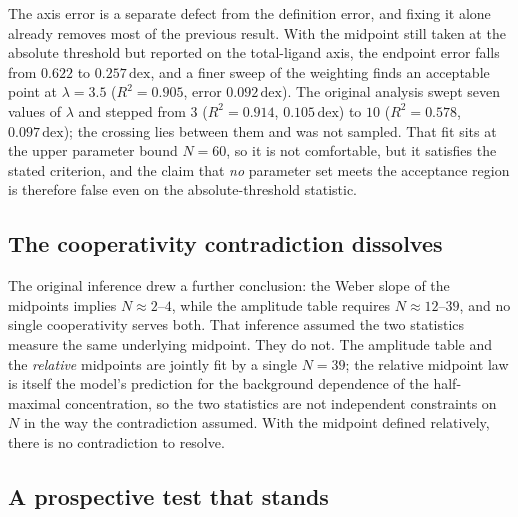 ﻿\documentclass[11pt,a4paper]{article}
\newcommand{\dex}{\ensuremath{\,\mathrm{dex}}}
\begin{document}
The axis error is a separate defect from the definition error, and fixing it alone already removes
most of the previous result. With the midpoint still taken at the absolute threshold but reported on
the total-ligand axis, the endpoint error falls from $0.622$ to $0.257\dex$, and a finer sweep of the
weighting finds an acceptable point at $\lambda=3.5$ ($R^2=0.905$, error $0.092\dex$). The original
analysis swept seven values of $\lambda$ and stepped from $3$ ($R^2=0.914$, $0.105\dex$) to $10$
($R^2=0.578$, $0.097\dex$); the crossing lies between them and was not sampled. That fit sits at the
upper parameter bound $N=60$, so it is not comfortable, but it satisfies the stated criterion, and
the claim that \emph{no} parameter set meets the acceptance region is therefore false even on the
absolute-threshold statistic.

\subsection{The cooperativity contradiction dissolves}

The original inference drew a further conclusion: the Weber slope of the midpoints implies
$N\approx2$--$4$, while the amplitude table requires $N\approx12$--$39$, and no single cooperativity
serves both. That inference assumed the two statistics measure the same underlying midpoint. They do
not. The amplitude table and the \emph{relative} midpoints are jointly fit by a single $N=39$; the
relative midpoint law is itself the model's prediction for the background dependence of the
half-maximal concentration, so the two statistics are not independent constraints on $N$ in the way
the contradiction assumed. With the midpoint defined relatively, there is no contradiction to
resolve.

\subsection{A prospective test that stands}
\end{document}
